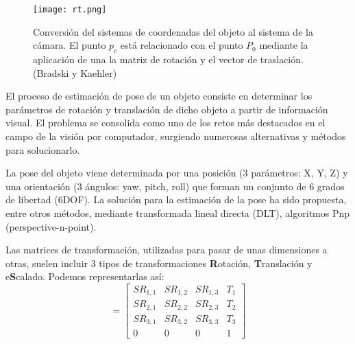 \begin{figure}
  \centering
  \texttt{[image: rt.png]}
  \caption{Conversión del sistemas de coordenadas del objeto al sistema de la cámara. El punto $p_c$
    está relacionado con el punto $P_0$ mediante la aplicación de una la matriz de rotación y el
    vector de traslación. (Bradski y Kaehler)}
  \label{fig:RT}
\end{figure}

El proceso de estimación de pose de un objeto consiste en determinar los parámetros de rotación y translación de dicho objeto a partir de información visual. El problema se consolida como uno de los retos más destacados en el campo de la visión por computador, surgiendo numerosas alternativas y métodos para solucionarlo.

La pose del objeto viene determinada por una posición (3 parámetros: X, Y, Z) y una orientación (3 ángulos: yaw, pitch, roll) que forman un conjunto de 6 grados de libertad (6DOF). La solución para la estimación de la pose ha sido propuesta, entre otros métodos, mediante transformada lineal directa (DLT), algoritmos Pnp (perspective-n-point).


Las matrices de transformación, utilizadas para pasar de unas dimensiones a otras, suelen incluir 3
tipos de transformaciones \textbf{R}otación, \textbf{T}ranslación y e\textbf{S}calado. Podemos representarlas así:
\begin{equation}
  [R|t] = \begin{bmatrix} SR_{1,1} & SR_{1,2} & SR_{1,3} & T_{1}  \\
    SR_{2,1} & SR_{2,2} & SR_{2,3} & T_{2}  \\
    SR_{3,1} & SR_{3,2} & SR_{3,3} & T_{3}  \\
    0    &     0   &     0   &  1
  \end{bmatrix}
\end{equation}

